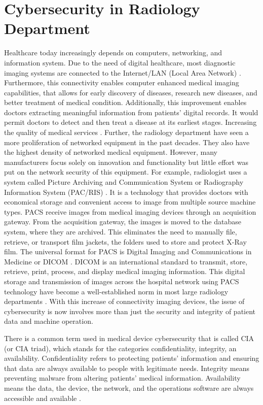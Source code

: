 \documentclass[pdf,bookmarks,colorlinks=true]{IEEEtran}
\begin{document}
\section{Cybersecurity in Radiology Department}
\label{sec:Radiology}
Healthcare today increasingly depends on computers, networking, and information system. Due to the need of digital healthcare, most diagnostic imaging systems are connected to the Internet/LAN (Local Area Network) \cite{ma2019medical}. Furthermore, this connectivity enables computer enhanced medical imaging capabilities, that allows for early discovery of diseases, research new diseases, and better treatment of medical condition. Additionally, this improvement enables doctors extracting meaningful information from patients' digital records. It would permit doctors to detect and then treat a disease at its earliest stages. Increasing the quality of medical services \cite{Marwan}.
Further, the radiology department have seen a more proliferation of networked equipment in the past decades. They also have the highest density of networked medical equipment. However, many manufacturers focus solely on innovation and functionality but little effort was put on the network security of this equipment. For example, radiologist uses a system called Picture Archiving and Communication System or Radiography Information System (PAC/RIS) \cite{ferrara2019cybersecurity}. It is a technology that provides doctors with economical storage and convenient access to image from multiple source machine types. PACS receive images from medical imaging devices through an acquisition gateway. From the acquisition gateway, the images is moved to the database system, where they are archived. This eliminates the need to manually file, retrieve, or transport film jackets, the folders used to store and protect X-Ray film. The universal format for PACS is Digital Imaging and Communications in Medicine or DICOM \cite{InformationSecurityonDiagnosticImagingSystem}. DICOM is an international standard to transmit, store, retrieve, print, process, and display medical imaging information. This digital storage and transmission of images across the hospital network using PACS technology have become a well-established norm in most large radiology departments \cite{moses2015lack}. With this increase of connectivity imaging devices, the issue of cybersecurity is now involves more than just the security and integrity of patient data and machine operation. \par 
There is a common term used in medical device cybersecurity that is called CIA (or CIA triad), which stands for the categories confidentiality, integrity, an availability. Confidentiality refers to protecting patients' information and ensuring that data are always available to people with legitimate needs. Integrity means preventing malware from altering patients' medical information. Availability means the data, the device, the network, and  the operations software are always accessible and available \cite{mahler2018know}. 
\end{document}

